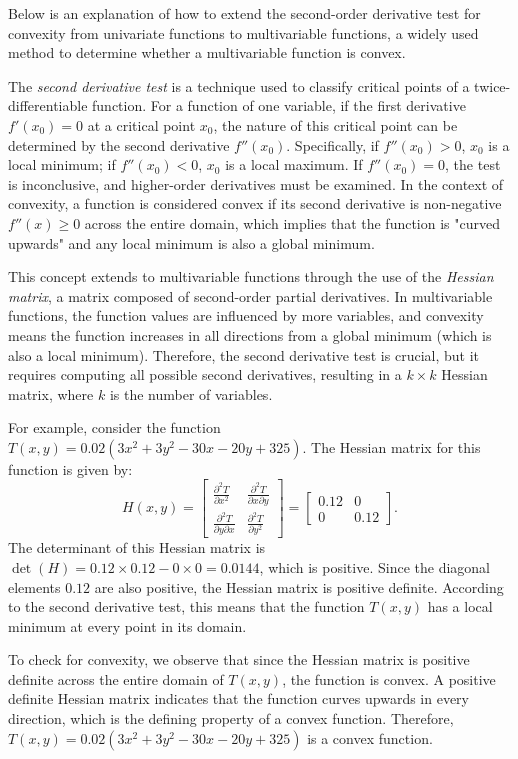 \documentclass[12pt,a4paper]{article}
\begin{document}
\begin{remark}
Below is an explanation of how to extend the second-order derivative test for convexity from univariate functions to multivariable functions, a widely used method to determine whether a multivariable function is convex.

The \textit{second derivative test} is a technique used to classify critical points of a twice-differentiable function. For a function of one variable, if the first derivative \( f'(x_0) = 0 \) at a critical point \( x_0 \), the nature of this critical point can be determined by the second derivative \( f''(x_0) \). Specifically, if \( f''(x_0) > 0 \), \( x_0 \) is a local minimum; if \( f''(x_0) < 0 \), \( x_0 \) is a local maximum. If \( f''(x_0) = 0 \), the test is inconclusive, and higher-order derivatives must be examined. In the context of convexity, a function is considered convex if its second derivative is non-negative \( f''(x) \geq 0 \) across the entire domain, which implies that the function is "curved upwards" and any local minimum is also a global minimum.

This concept extends to multivariable functions through the use of the \textit{Hessian matrix}\cite{apostol_mathematical_1974}, a matrix composed of second-order partial derivatives. In multivariable functions, the function values are influenced by more variables, and convexity means the function increases in all directions from a global minimum (which is also a local minimum). Therefore, the second derivative test is crucial, but it requires computing all possible second derivatives, resulting in a \( k \times k \) Hessian matrix, where \( k \) is the number of variables.

For example, consider the function \( T(x, y) = 0.02\left(3x^{2} + 3y^{2} - 30x - 20y + 325\right) \). The Hessian matrix for this function is given by:
\[
H(x, y) = \begin{bmatrix} 
\frac{\partial^2 T}{\partial x^2} & \frac{\partial^2 T}{\partial x \partial y} \\ 
\frac{\partial^2 T}{\partial y \partial x} & \frac{\partial^2 T}{\partial y^2} 
\end{bmatrix}
= \begin{bmatrix}
0.12 & 0 \\
0 & 0.12
\end{bmatrix}.
\]
The determinant of this Hessian matrix is \( \det(H) = 0.12 \times 0.12 - 0 \times 0 = 0.0144 \), which is positive. Since the diagonal elements \( 0.12 \) are also positive, the Hessian matrix is positive definite. According to the second derivative test, this means that the function \( T(x, y) \) has a local minimum at every point in its domain.

To check for convexity, we observe that since the Hessian matrix is positive definite across the entire domain of \( T(x, y) \), the function is convex. A positive definite Hessian matrix indicates that the function curves upwards in every direction, which is the defining property of a convex function. Therefore, \( T(x, y) = 0.02\left(3x^{2} + 3y^{2} - 30x - 20y + 325\right) \) is a convex function.
\end{remark}
\end{document}
